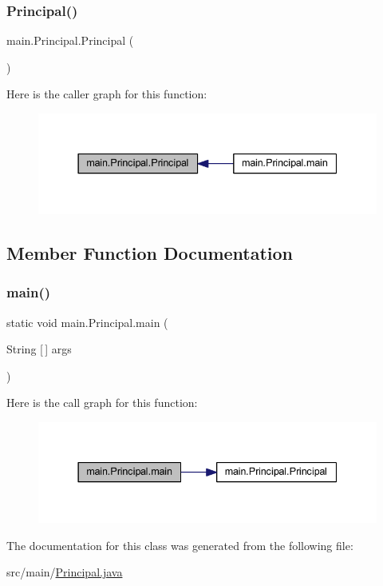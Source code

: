 \subsubsection{\texorpdfstring{Principal()}{Principal()}}
{\footnotesize\ttfamily main.\+Principal.\+Principal (\begin{DoxyParamCaption}{ }\end{DoxyParamCaption})}

Here is the caller graph for this function\+:
\nopagebreak
\begin{figure}[H]
\begin{center}
\leavevmode
\includegraphics[width=337pt]{classmain_1_1_principal_ac8d78a8bf8fa59afabd1c8dc8de7063d_icgraph}
\end{center}
\end{figure}


\subsection{Member Function Documentation}
\mbox{\label{classmain_1_1_principal_aa28fb81dfdd4ce81c98f62953d4fc72d}} 
\subsubsection{\texorpdfstring{main()}{main()}}
{\footnotesize\ttfamily static void main.\+Principal.\+main (\begin{DoxyParamCaption}\item[{String \mbox{[}$\,$\mbox{]}}]{args }\end{DoxyParamCaption})\hspace{0.3cm}{\ttfamily [static]}}

Here is the call graph for this function\+:
\nopagebreak
\begin{figure}[H]
\begin{center}
\leavevmode
\includegraphics[width=337pt]{classmain_1_1_principal_aa28fb81dfdd4ce81c98f62953d4fc72d_cgraph}
\end{center}
\end{figure}


The documentation for this class was generated from the following file\+:\begin{DoxyCompactItemize}
\item 
src/main/\mbox{\hyperlink{_principal_8java}{Principal.\+java}}\end{DoxyCompactItemize}
